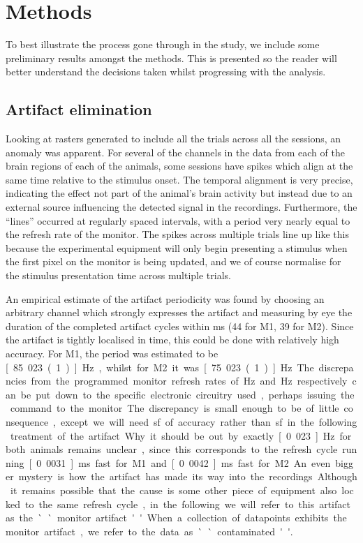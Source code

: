 \section{Methods}

To best illustrate the process gone through in the study, we include some preliminary results amongst the methods.
This is presented so the reader will better understand the decisions taken whilst progressing with the analysis.

\FloatBarrier
\subsection{Artifact elimination}
\label{sec:ma}

Looking at rasters generated to include all the trials across all the sessions, an anomaly was apparent.
For several of the channels in the data from each of the brain regions of each of the animals, some sessions have spikes which align at the same time relative to the stimulus onset. The temporal alignment is very precise, indicating the effect not part of the animal's brain activity but instead due to an external source influencing the detected signal in the recordings. Furthermore, the ``lines'' occurred at regularly spaced intervals, with a period very nearly equal to the refresh rate of the monitor. The spikes across multiple trials line up like this because the experimental equipment will only begin presenting a stimulus when the first pixel on the monitor is being updated, and we of course normalise for the stimulus presentation time across multiple trials.

An empirical estimate of the artifact periodicity was found by choosing an arbitrary channel which strongly expresses the artifact and measuring by eye the duration of the completed artifact cycles within \unit[530]{ms} (44 for \ac{M1}, 39 for \ac{M2}). Since the artifact is tightly localised in time, this could be done with relatively high accuracy. For \ac{M1}, the period was estimated to be \unit[85.023(1)]{Hz}, whilst for \ac{M2} it was \unit[75.023(1)]{Hz}. The discrepancies from the programmed monitor refresh rates of \unit[85]{Hz} and \unit[75]{Hz} respectively can be put down to the specific electronic circuitry used, perhaps issuing the command to the monitor. The discrepancy is small enough to be of little consequence, except we will need \unit[5]{sf} of accuracy rather than \unit[2]{sf} in the following treatment of the artifact. Why it should be out by exactly \unit[0.023]{Hz} for both animals remains unclear, since this corresponds to the refresh cycle running \unit[0.0031]{ms} fast for \ac{M1} and \unit[0.0042]{ms} fast for \ac{M2}. An even bigger mystery is how the artifact has made its way into the recordings. Although it remains possible that the cause is some other piece of equipment also locked to the same refresh cycle, in the following we will refer to this artifact as the ``monitor artifact''. When a collection of datapoints exhibits the monitor artifact, we refer to the data as ``contaminated''.

